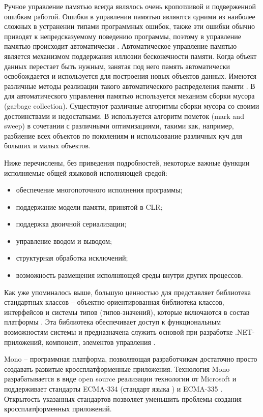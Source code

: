 Ручное управление памятью всегда являлось очень кропотливой и подверженной ошибкам работой. Ошибки в управлении памятью являются одними из наиболее сложных в устранении типами программных ошибок, также эти ошибки обычно приводят к непредсказуемому поведению программы, поэтому в \DotNet управление памятью происходит автоматически \cite{Richter}. Автоматическое управление памятью является механизмом поддержания иллюзии бесконечности памяти. Когда объект данных перестает быть нужным, занятая под него память автоматически освобождается и используется для построения новых объектов данных. Имеются различные методы реализации такого автоматического распределения памяти \cite{SICP}. В \DotNet для автоматического управления памятью используется механизм сборки мусора (garbage collection). Существуют различные алгоритмы сборки мусора со своими достоинствами и недостатками. В \DotNet используется алгоритм пометок (mark and sweep) в сочетании с различными оптимизациями, такими как, например, разбиение всех объектов по поколениям и использование различных куч для больших и малых объектов.

Ниже перечислены, без приведения подробностей, некоторые важные функции исполняемые общей языковой исполняющей средой:
\begin{itemize}
    \item обеспечение многопоточного исполнения программы;
    \item поддержание модели памяти, принятой в CLR;
    \item поддержка двоичной сериализации;
    \item управление вводом и выводом;
    \item структурная обработка исключений;
    \item возможность размещения исполняющей среды внутри других процессов.
\end{itemize}

Как уже упоминалось выше, большую ценностью для \DotNet представляет библиотека стандартных классов -- объектно-ориентиро\-ванная библиотека классов, интерфейсов и системы типов (типов-значений), которые включаются в состав платформы \DotNet. Эта библиотека обеспечивает доступ к функциональным возможностям системы и предназначена служить основой при разработке .NET-приложений, компонент, элементов управления \cite{Marchenko}.

Mono -- программная платформа, позволяющая разработчикам достаточно просто создавать развитые кроссплатформенные приложения. Технология Mono разрабатывается в виде open source реализации технологии \DotNet от Microsoft и поддерживает стандарты ECMA-334 (стандарт языка \CSharp) и ECMA-335 \cite{ECMA335}. Открытость указанных стандартов позволяет уменьшить проблемы создания кроссплатформенных приложений.

